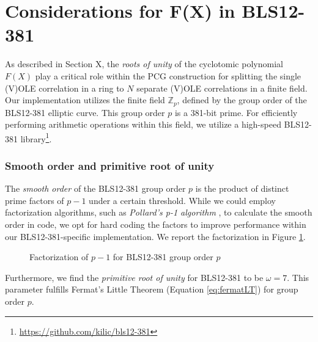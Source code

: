 \section{Considerations for F(X) in BLS12-381}
As described in Section X, the \textit{roots of unity} of the cyclotomic polynomial $F(X)$ play a critical role within the PCG construction for splitting the single (V)OLE correlation in a ring to $N$ separate (V)OLE correlations in a finite field. Our implementation utilizes the finite field $\mathbb{Z}_p$, defined by the group order of the BLS12-381 elliptic curve. This group order $p$ is a 381-bit prime. For efficiently performing arithmetic operations within this field, we utilize a high-speed BLS12-381 library\footnote{\url{https://github.com/kilic/bls12-381}}.

\subsubsection{Smooth order and primitive root of unity}
The \textit{smooth order} of the BLS12-381 group order $p$ is the product of distinct prime factors of $p-1$ under a certain threshold. While we could employ factorization algorithms, such as \textit{Pollard's p-1 algorithm} \cite{pollard1974theorems}, to calculate the smooth order in code, we opt for hard coding the factors to improve performance within our BLS12-381-specific implementation. We report the factorization in Figure \ref{fig:pminus1factorization}.

\begin{figure}[htbp]
\centering
\setlength{\fboxsep}{10pt}
\caption{Factorization of \(p-1\) for BLS12-381 group order $p$}
\label{fig:pminus1factorization}
\end{figure}

Furthermore, we find the \textit{primitive root of unity} for BLS12-381 to be $\omega = 7$. This parameter fulfills Fermat's Little Theorem (Equation \ref{eq:fermatLT}) for group order $p$.

